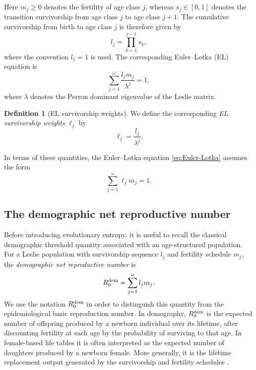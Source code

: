 \documentclass[10pt,a4paper]{amsart}
\theoremstyle{definition}
\newtheorem{defn}[thm]{Definition}
\theoremstyle{remark}
\numberwithin{equation}{section}
\begin{document}
Here \(m_j\ge0\) denotes the fertility of age class \(j\), whereas
\(s_j\in[0,1]\) denotes the transition survivorship from age class
\(j\) to age class \(j+1\).
The cumulative survivorship from birth to age class \(j\) is therefore given by 
\[
l_j=
\prod_{k=1}^{j-1}s_k,
\]
where the convention \(l_1=1\) is used.
The corresponding Euler--Lotka (EL) equation is
\begin{equation}
	\label{eq:Euler-Lotka}
	\sum_{j=1}^{\omega}
	\frac{l_jm_j}{\lambda^j}
	=
	1,
\end{equation}
where \(\lambda\) denotes the Perron dominant eigenvalue of the
Leslie matrix. 

\begin{defn}[EL survivorship weights] We define the corresponding {\em EL survivorship weights} $\ell_j$ by 
\begin{equation}
	\label{eq:EL_survivorship}
	\ell_j
	=
	\frac{l_j}{\lambda^j}.
\end{equation}
\end{defn}

In terms of these quantities, the Euler--Lotka equation \eqref{eq:Euler-Lotka} assumes the
form
\begin{equation}
\label{eq_Euler-Lotka}
\sum_{j=1}^{\omega}\ell_jm_j=1.
\end{equation}

\subsection{The demographic net reproductive number}
\label{subsec_R0_dem}

Before introducing evolutionary entropy, it is useful to recall the classical demographic threshold quantity associated with an age-structured population. For a Leslie population with survivorship sequence $l_j$ and fertility schedule $m_j$, the \emph{demographic net reproductive number} is
\begin{equation}
\label{eq:R0dem}
R_0^{\rm dem}=\sum_{j=1}^{\omega}l_jm_j.
\end{equation}
We use the notation $R_0^{\rm dem}$ in order to distinguish this quantity from the epidemiological basic reproduction number. In demography, $R_0^{\rm dem}$ is the expected number of offspring produced by a newborn individual over its lifetime, after discounting fertility at each age by the probability of surviving to that age. In female-based life tables it is often interpreted as the expected number of daughters produced by a newborn female. More generally, it is the lifetime replacement output generated by the survivorship and fertility schedules \cite{Keyfitz1968,Caswell,Charlesworth,Cus}.
\end{document}
